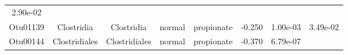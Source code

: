 \documentclass[11pt,]{article}
\begin{document}
\begin{longtable}[]{@{}cccccccc@{}}
\begin{minipage}[t]{0.08\columnwidth}
2.90e-02\strut
\end{minipage}\tabularnewline
\begin{minipage}[t]{0.08\columnwidth}\centering\strut
Otu01139\strut
\end{minipage} & \begin{minipage}[t]{0.15\columnwidth}\centering\strut
Clostridia\strut
\end{minipage} & \begin{minipage}[t]{0.15\columnwidth}\centering\strut
Clostridia\strut
\end{minipage} & \begin{minipage}[t]{0.08\columnwidth}\centering\strut
normal\strut
\end{minipage} & \begin{minipage}[t]{0.09\columnwidth}\centering\strut
propionate\strut
\end{minipage} & \begin{minipage}[t]{0.07\columnwidth}\centering\strut
-0.250\strut
\end{minipage} & \begin{minipage}[t]{0.08\columnwidth}\centering\strut
1.00e-03\strut
\end{minipage} & \begin{minipage}[t]{0.08\columnwidth}\centering\strut
3.49e-02\strut
\end{minipage}\tabularnewline
\begin{minipage}[t]{0.08\columnwidth}\centering\strut
Otu00144\strut
\end{minipage} & \begin{minipage}[t]{0.15\columnwidth}\centering\strut
Clostridiales\strut
\end{minipage} & \begin{minipage}[t]{0.15\columnwidth}\centering\strut
Clostridiales\strut
\end{minipage} & \begin{minipage}[t]{0.08\columnwidth}\centering\strut
normal\strut
\end{minipage} & \begin{minipage}[t]{0.09\columnwidth}\centering\strut
propionate\strut
\end{minipage} & \begin{minipage}[t]{0.07\columnwidth}\centering\strut
-0.370\strut
\end{minipage} & \begin{minipage}[t]{0.08\columnwidth}\centering\strut
6.79e-07\strut
\end{minipage} & \begin{minipage}[t]{0.08\columnwidth}\centering\strut

\end{minipage}
\end{longtable}
\end{document}
